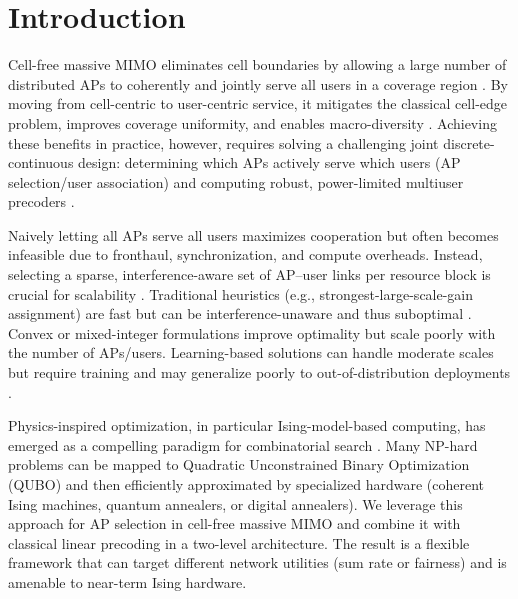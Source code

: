 {\section{Introduction}
Cell-free massive MIMO eliminates cell boundaries by allowing a large number of distributed APs to coherently and jointly serve all users in a coverage region \cite{ngo2017cell,demir2021foundations}. By moving from cell-centric to user-centric service, it mitigates the classical cell-edge problem, improves coverage uniformity, and enables macro-diversity \cite{buzzi2019user}. Achieving these benefits in practice, however, requires solving a challenging joint discrete-continuous design: determining which APs actively serve which users (AP selection/user association) and computing robust, power-limited multiuser precoders \cite{nayebi2017precoding,bjornson2019making}.

Naively letting all APs serve all users maximizes cooperation but often becomes infeasible due to fronthaul, synchronization, and compute overheads. Instead, selecting a sparse, interference-aware set of AP–user links per resource block is crucial for scalability \cite{interdonato2019scalability,chen2020structured}. Traditional heuristics (e.g., strongest-large-scale-gain assignment) are fast but can be interference-unaware and thus suboptimal \cite{zhang2019cell}. Convex or mixed-integer formulations improve optimality but scale poorly with the number of APs/users. Learning-based solutions can handle moderate scales but require training and may generalize poorly to out-of-distribution deployments \cite{elsherif2022resource,zappone2021uplink}.

Physics-inspired optimization, in particular Ising-model-based computing, has emerged as a compelling paradigm for combinatorial search \cite{lucas2014ising,mcmahon2016fully,inagaki2016coherent,kasi2021resource,grassl2022ising}. Many NP-hard problems can be mapped to Quadratic Unconstrained Binary Optimization (QUBO) and then efficiently approximated by specialized hardware (coherent Ising machines, quantum annealers, or digital annealers). We leverage this approach for AP selection in cell-free massive MIMO and combine it with classical linear precoding in a two-level architecture. The result is a flexible framework that can target different network utilities (sum rate or fairness) and is amenable to near-term Ising hardware.

}
